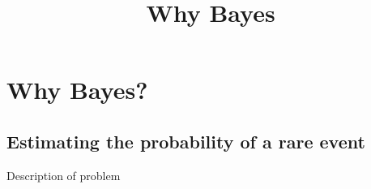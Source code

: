 \documentclass[10pt]{beamer}
\title{Why Bayes}
\begin{document}
\maketitle

%
%
%
%

\section{Why Bayes?}
\subsection{Estimating the probability of a rare event}

\begin{frame}{Description of problem}
\end{frame}
\end{document}
